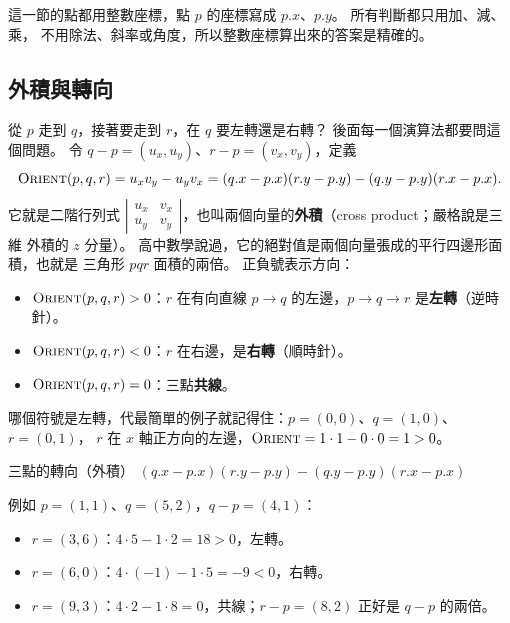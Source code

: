 這一節的點都用整數座標，點 $p$ 的座標寫成 $p.x$、$p.y$。 所有判斷都只用加、減、乘，
不用除法、斜率或角度，所以整數座標算出來的答案是精確的。

\subsection{外積與轉向}
\label{sec:dc-orient}

從 $p$ 走到 $q$，接著要走到 $r$，在 $q$ 要左轉還是右轉？ 後面每一個演算法都要問這
個問題。 令 $q - p = (u_x, u_y)$、$r - p = (v_x, v_y)$，定義
\[
\proc{Orient}(p, q, r) = u_x v_y - u_y v_x
= (q.x - p.x)(r.y - p.y) - (q.y - p.y)(r.x - p.x).
\]
它就是二階行列式 $\left|\begin{smallmatrix} u_x & v_x \\ u_y & v_y
\end{smallmatrix}\right|$，也叫兩個向量的\textbf{外積}（cross product；嚴格說是三維
外積的 $z$ 分量）。 高中數學說過，它的絕對值是兩個向量張成的平行四邊形面積，也就是
三角形 $pqr$ 面積的兩倍。 正負號表示方向：

\begin{itemize}
\item $\proc{Orient}(p, q, r) > 0$：$r$ 在有向直線 $p \to q$ 的左邊，$p \to q \to r$
是\textbf{左轉}（逆時針）。
\item $\proc{Orient}(p, q, r) < 0$：$r$ 在右邊，是\textbf{右轉}（順時針）。
\item $\proc{Orient}(p, q, r) = 0$：三點\textbf{共線}。
\end{itemize}

哪個符號是左轉，代最簡單的例子就記得住：$p = (0, 0)$、$q = (1, 0)$、$r = (0, 1)$，
$r$ 在 $x$ 軸正方向的左邊，$\proc{Orient} = 1 \cdot 1 - 0 \cdot 0 = 1 > 0$。

\begin{pseudo}[label=alg:dc-orient]{三點的轉向（外積）}
    \State \Return $(q.x - p.x)(r.y - p.y) - (q.y - p.y)(r.x - p.x)$
\EndFunction
\end{pseudo}

例如 $p = (1, 1)$、$q = (5, 2)$，$q - p = (4, 1)$：

\begin{itemize}
\item $r = (3, 6)$：$4 \cdot 5 - 1 \cdot 2 = 18 > 0$，左轉。
\item $r = (6, 0)$：$4 \cdot (-1) - 1 \cdot 5 = -9 < 0$，右轉。
\item $r = (9, 3)$：$4 \cdot 2 - 1 \cdot 8 = 0$，共線；$r - p = (8, 2)$ 正好是
$q - p$ 的兩倍。
\end{itemize}

